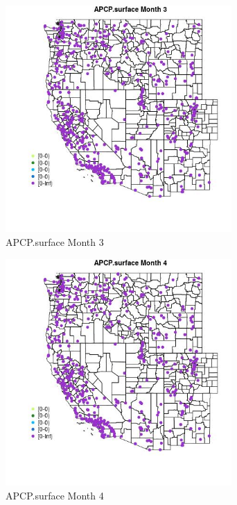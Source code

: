 \begin{figure} 
\centering  
\includegraphics[width=0.77\textwidth]{Code_Outputs/Report_ML_input_PM25_Step4_part_e_de_duplicated_aves_compiled_2019-05-14wNAs_MapObsMo3APCPsurface.jpg} 
\caption{\label{fig:Report_ML_input_PM25_Step4_part_e_de_duplicated_aves_compiled_2019-05-14wNAsMapObsMo3APCPsurface}APCP.surface Month 3} 
\end{figure} 
 

\begin{figure} 
\centering  
\includegraphics[width=0.77\textwidth]{Code_Outputs/Report_ML_input_PM25_Step4_part_e_de_duplicated_aves_compiled_2019-05-14wNAs_MapObsMo4APCPsurface.jpg} 
\caption{\label{fig:Report_ML_input_PM25_Step4_part_e_de_duplicated_aves_compiled_2019-05-14wNAsMapObsMo4APCPsurface}APCP.surface Month 4} 
\end{figure} 
 

